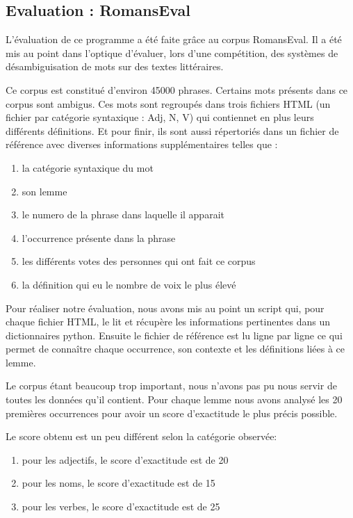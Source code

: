 \subsection{Evaluation : RomansEval}

L'évaluation de ce programme a été faite grâce au corpus RomansEval. Il a été 
mis au point dans l'optique d'évaluer, lors d'une compétition, des 
systèmes de désambiguisation de mots sur des textes littéraires. 

Ce corpus est constitué d'environ 45000 phrases. Certains mots présents dans ce 
corpus sont ambigus. Ces mots sont regroupés dans trois fichiers HTML (un 
fichier par catégorie syntaxique : Adj, N, V) qui contiennet en plus leurs 
différents définitions. Et pour finir, ils sont aussi répertoriés dans un 
fichier de référence avec diverses informations supplémentaires telles que :

\begin{enumerate}
 \item la catégorie syntaxique du mot
 \item son lemme
 \item le numero de la phrase dans laquelle il apparait
 \item l'occurrence présente dans la phrase
 \item les différents votes des personnes qui ont fait ce corpus
 \item la définition qui eu le nombre de voix le plus élevé
 \end{enumerate}

Pour réaliser notre évaluation, nous avons mis au point un script qui, pour 
chaque fichier HTML, le lit et récupère les informations pertinentes dans un 
dictionnaires python. Ensuite le fichier de référence est lu ligne par ligne 
ce qui permet de connaître chaque occurrence, son contexte et les définitions 
liées à ce lemme.

Le corpus étant beaucoup trop important, nous n'avons pas pu nous servir de 
toutes les données qu'il contient. Pour chaque lemme nous avons analysé les 20 
premières occurrences pour avoir un score d'exactitude le plus précis possible.

Le score obtenu est un peu différent selon la catégorie observée:

\begin{enumerate}
 \item pour les adjectifs, le score d'exactitude est de 20%
 \item pour les noms, le score d'exactitude est de 15%
 \item pour les verbes, le score d'exactitude est de 25%
\end{enumerate}

